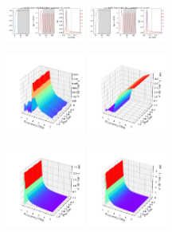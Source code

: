 \documentclass[a4paper]{article}
\begin{document}
\begin{figure}[H]
  \centering
  \includegraphics[width=0.23\textwidth]{HL-A1-v4-imp0.pdf}
  \includegraphics[width=0.23\textwidth]{HL-A1-v4-imp3.pdf}
\end{figure}
\begin{figure}[H]
  \centering
  \includegraphics[width=0.23\textwidth]{cond3d_real-A1-v4-imp0.pdf}
  \includegraphics[width=0.23\textwidth]{cond3d_real-A1-v4-imp3.pdf}
\end{figure}
\begin{figure}[H]
  \centering
  \includegraphics[width=0.23\textwidth]{cond3d_imag-A1-v4-imp0.pdf}
  \includegraphics[width=0.23\textwidth]{cond3d_imag-A1-v4-imp3.pdf}
\end{figure}
\end{document}
